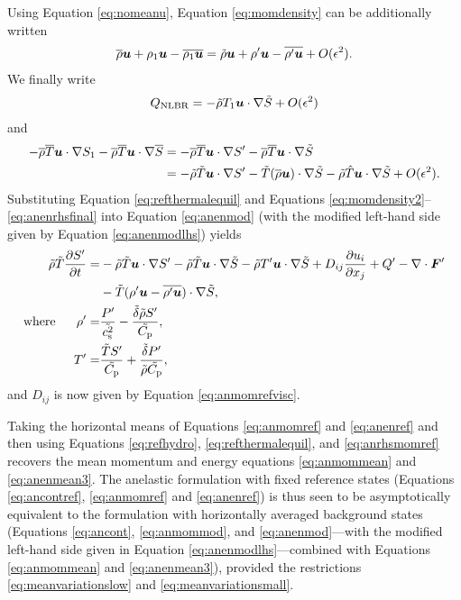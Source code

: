 \documentclass[12pt]{article}
\newcommand{\vecf}{\bm{F}}
\begin{document}
Using Equation \eqref{eq:nomeanu}, Equation \eqref{eq:momdensity} can be additionally written
  \begin{align}\label{eq:momdensity2}
\overline{\rho}\bm{u} + \rho_1\bm{u} - \overline{\rho_1\bm{u}} = \tilde{\rho}\bm{u} + \rho^\prime\bm{u} - \overline{\rho^\prime\bm{u}} + O(\epsilon^2).
\end{align}
We finally write 
\begin{align}
	Q_{\rm NLBR} = -\tilde{\rho} T_1\bm{u}\cdot\nabla\tilde{S} + O(\epsilon^2)
\end{align}
and 
\begin{align}\label{eq:anenrhsfinal}
	-\overline{\rho}\overline{T} \bm{u}\cdot\nabla S_1 - \overline{\rho}\overline{T} \bm{u}\cdot\nabla\overline{S} &= - \overline{\rho}\overline{T}\bm{u}\cdot\nabla S^\prime -\overline{\rho}\overline{T}\bm{u}\cdot\nabla\tilde{S} \nonumber\\
	&=-\tilde{\rho}\tilde{T}\bm{u}\cdot\nabla S^\prime - \tilde{T}(\overline{\rho} \bm{u})\cdot\nabla\tilde{S} - \tilde{\rho}\hat{T}\bm{u}\cdot\nabla\tilde{S} + O(\epsilon^2).
\end{align}
Substituting Equation \eqref{eq:refthermalequil} and Equations \eqref{eq:momdensity2}--\eqref{eq:anenrhsfinal} into Equation \eqref{eq:anenmod} (with the modified left-hand side given by Equation \eqref{eq:anenmodlhs}) yields
\begin{subequations}\label{eq:anenref}
	\begin{align}
		\rhotilde\tilde{T}\pderiv{\entrprime}{t}= &-\rhotilde\tilde{T}\ugrad \entrprime - \rhotilde\tilde{T} \ugrad \tilde{S} - \rhotilde \tmpprime\ugrad\tilde{S}+D_{ij}\pderiv{u_i}{x_j} + Q^\prime- \Div\vecf^\prime  \nonumber\\
		& - \tilde{T}(\rhoprime \vecu-\overline{\rhoprime\vecu})\cdot\nabla\tilde{S},\label{eq:anenrefmain}\\
		\where \rhoprime =& \frac{\prsprime}{\tilde{\cs^2}}-\frac{\tilde{\delta}\rhotilde S ^\prime}{\tilde{\cpcap}},\\
		 \tmpprime = & \frac{\tilde{T} \entrprime}{\tilde{\cpcap}} + \frac{\tilde{\delta} \prsprime}{\rhotilde\tilde{\cpcap}},
	\end{align}
\end{subequations}
and $D_{ij}$ is now given by Equation \eqref{eq:anmomrefvisc}. 

Taking the horizontal means of Equations \eqref{eq:anmomref} and \eqref{eq:anenref} and then using Equations \eqref{eq:refhydro}, \eqref{eq:refthermalequil}, and \eqref{eq:anrhsmomref} recovers the mean momentum and energy equations \eqref{eq:anmommean} and \eqref{eq:anenmean3}. The anelastic formulation with fixed reference states (Equations \eqref{eq:ancontref}, \eqref{eq:anmomref} and \eqref{eq:anenref}) is thus seen to be asymptotically equivalent to the formulation with horizontally averaged background states (Equations \eqref{eq:ancont}, \eqref{eq:anmommod}, and \eqref{eq:anenmod}---with the modified left-hand side given in Equation \eqref{eq:anenmodlhs}---combined with Equations \eqref{eq:anmommean} and \eqref{eq:anenmean3}), provided the restrictions \eqref{eq:meanvariationslow} and \eqref{eq:meanvariationsmall}.
\end{document}
